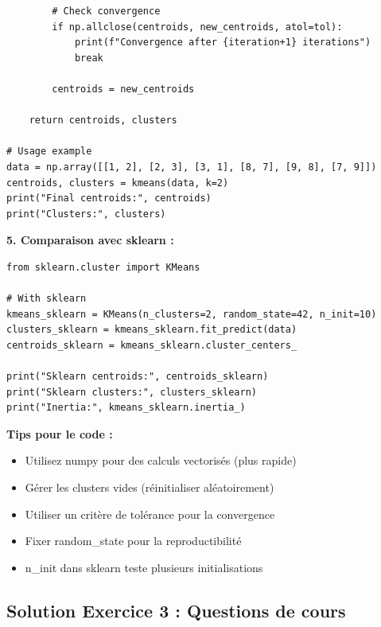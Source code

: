 \documentclass[11pt,a4paper]{article}
\begin{document}
\begin{solutionbox}
\begin{lstlisting}
        # Check convergence
        if np.allclose(centroids, new_centroids, atol=tol):
            print(f"Convergence after {iteration+1} iterations")
            break
        
        centroids = new_centroids
    
    return centroids, clusters

# Usage example
data = np.array([[1, 2], [2, 3], [3, 1], [8, 7], [9, 8], [7, 9]])
centroids, clusters = kmeans(data, k=2)
print("Final centroids:", centroids)
print("Clusters:", clusters)
\end{lstlisting}

\textbf{5. Comparaison avec sklearn :}

\begin{lstlisting}
from sklearn.cluster import KMeans

# With sklearn
kmeans_sklearn = KMeans(n_clusters=2, random_state=42, n_init=10)
clusters_sklearn = kmeans_sklearn.fit_predict(data)
centroids_sklearn = kmeans_sklearn.cluster_centers_

print("Sklearn centroids:", centroids_sklearn)
print("Sklearn clusters:", clusters_sklearn)
print("Inertia:", kmeans_sklearn.inertia_)
\end{lstlisting}
\end{solutionbox}

\begin{tipbox}
\textbf{Tips pour le code :}
\begin{itemize}
    \item Utilisez numpy pour des calculs vectorisés (plus rapide)
    \item Gérer les clusters vides (réinitialiser aléatoirement)
    \item Utiliser un critère de tolérance pour la convergence
    \item Fixer random\_state pour la reproductibilité
    \item n\_init dans sklearn teste plusieurs initialisations
\end{itemize}
\end{tipbox}

\subsection{Solution Exercice 3 : Questions de cours}
\end{document}
